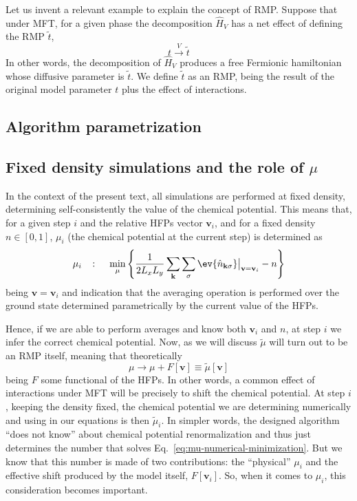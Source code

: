 Let us invent a relevant example to explain the concept of RMP. Suppose that under MFT, for a given phase the decomposition $\hat H_V$ has a net effect of defining the RMP $\tilde{t}$,
\[
	t \stackrel{V}{\to} \tilde{t}
\]
In other words, the decomposition of $\hat H_V$ produces a free Fermionic hamiltonian whose diffusive parameter is $\tilde{t}$. We define $\tilde{t}$ as an RMP, being the result of the original model parameter $t$ plus the effect of interactions. 

\subsection{Algorithm parametrization}
\todo

\subsection{Fixed density simulations and the role of $\mu$}\label{subsec:fixed-density-role-mu}

In the context of the present text, all simulations are performed at fixed density, determining self-consistently the value of the chemical potential. This means that, for a given step $i$ and the relative HFPs vector $\mathbf{v}_i$, and for a fixed density $n\in[0,1]$, $\mu_i$ (the chemical potential at the current step) is determined as
\begin{equation}\label{eq:mu-numerical-minimization}
	\mu_i
	\quad\colon\quad
	\min_\mu \left\lbrace
		\frac{1}{2L_x L_y} \sum_\mathbf{k} \sum_\sigma \ev{\hat n_{\mathbf{k}\sigma}} \big|_{\mathbf{v}=\mathbf{v}_i} - n
	\right\rbrace
\end{equation}
being $\mathbf{v}=\mathbf{v}_i$ and indication that the averaging operation is performed over the ground state determined parametrically by the current value of the HFPs.

Hence, if we are able to perform averages and know both $\mathbf{v}_i$ and $n$, at step $i$ we infer the correct chemical potential. Now, as we will discuss $\tilde{\mu}$ will turn out to be an RMP itself, meaning that theoretically
\[
	\mu \to \mu + F[\mathbf{v}] \equiv \tilde{\mu} [\mathbf{v}]
\]
being $F$ some functional of the HFPs. In other words, a common effect of interactions under MFT will be precisely to shift the chemical potential. At step $i$, keeping the density fixed, the chemical potential we are determining numerically and using in our equations is then $\tilde{\mu}_i$. In simpler words, the designed algorithm ``does not know'' about chemical potential renormalization and thus just determines the number that solves Eq.~\eqref{eq:mu-numerical-minimization}. But we know that this number is made of two contributions: the ``physical'' $\mu_i$ and the effective shift produced by the model itself, $F[\mathbf{v}_i]$. So, when it comes to $\mu_i$, this consideration becomes important.

